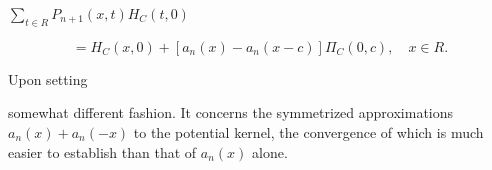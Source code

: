 $\sum_{t \in R} P_{n+1}(x,t) H_C(t,0)$

$$= H_C(x,0) + [a_n(x) - a_n(x-c)]\Pi_C(0,c), \quad x \in R.$$

Upon setting

somewhat different fashion. It concerns the symmetrized approximations $a_n(x) + a_n(-x)$ to the potential kernel, the convergence of which is much easier to establish than that of $a_n(x)$ alone.